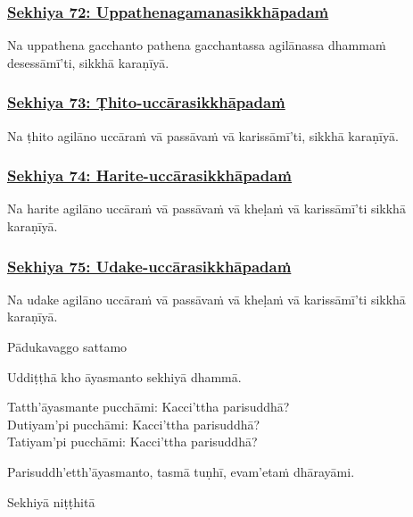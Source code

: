 \subsubsection*{\hyperref[training72]{Sekhiya 72: Uppathenagamanasikkhāpadaṁ}}
\label{sekh72}
Na uppathena gacchanto pathena gacchantassa agilānassa dhammaṁ desessāmī'ti, sikkhā karaṇīyā.

\subsubsection*{\hyperref[training73]{Sekhiya 73: Ṭhito-uccārasikkhāpadaṁ}}
\label{sekh73}
Na ṭhito agilāno uccāraṁ vā passāvaṁ vā karissāmī'ti, sikkhā karaṇīyā.

\subsubsection*{\hyperref[training74]{Sekhiya 74: Harite-uccārasikkhāpadaṁ}}
\label{sekh74}
Na harite agilāno uccāraṁ vā passāvaṁ vā kheḷaṁ vā karissāmī'ti sikkhā karaṇīyā.

\subsubsection*{\hyperref[training75]{Sekhiya 75: Udake-uccārasikkhāpadaṁ}}
\label{sekh75}
Na udake agilāno uccāraṁ vā passāvaṁ vā kheḷaṁ vā karissāmī'ti sikkhā karaṇīyā.

\begin{center}
  Pādukavaggo sattamo
\end{center}

\medskip

\begin{center}
Uddiṭṭhā kho āyasmanto sekhiyā dhammā.

\smallskip

Tatth'āyasmante pucchāmi: Kacci'ttha parisuddhā?\\
Dutiyam'pi pucchāmi: Kacci'ttha parisuddhā?\\
Tatiyam'pi pucchāmi: Kacci'ttha parisuddhā?

\smallskip

Parisuddh'etth'āyasmanto, tasmā tuṇhī, evam'etaṁ dhārayāmi.
\end{center}

\begin{outro}
  Sekhiyā niṭṭhitā
\end{outro}

\clearpage
